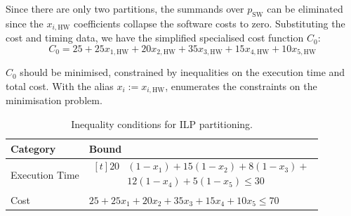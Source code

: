 \documentclass{article}
\numberwithin{equation}{section}
\numberwithin{table}{section}
\numberwithin{figure}{section}
\begin{document}
\begin{enumerate}
\begin{enumerate}
            Since there are only two partitions, the summands over $p_\text{SW}$
            can be eliminated since the $x_{i,\text{HW}}$ coefficients collapse
            the software costs to zero. Substituting the cost and timing data,
            we have the simplified specialised cost function $C_0$:
            \begin{equation}
                C_0 = 25 + 25x_{1,\text{HW}} + 20x_{2,\text{HW}} +
                    35x_{3,\text{HW}} + 15x_{4,\text{HW}} + 10x_{5,\text{HW}}
                \label{eqn:partition-cost}
            \end{equation}

            $C_0$ should be minimised, constrained by inequalities on the
            execution time and total cost. With the alias $x_i :=
            x_{i,\text{HW}}$,  enumerates the constraints
            on the minimisation problem.

            \begin{table}
                \centering%
                \begin{tabular}{ll}
                    Category & Bound \\
                    \toprule
                    Execution Time & $\begin{aligned}[t]
                        20 &\left(1-x_1\right) + 15\left(1-x_2\right) +
                        8\left(1-x_3\right) +\\
                        &12\left(1-x_4\right) + 5\left(1-x_5\right) \leq 30
                    \end{aligned}$ \\
                    Cost & $25 + 25x_1 + 20x_2 + 35x_3 + 15x_4 + 10x_5 \leq 70$
                    \\ \bottomrule
                \end{tabular}
                \caption{Inequality conditions for ILP partitioning.}%
                \label{table:ilp-bounds}
            \end{table}


\end{enumerate}
\end{enumerate}
\end{document}
